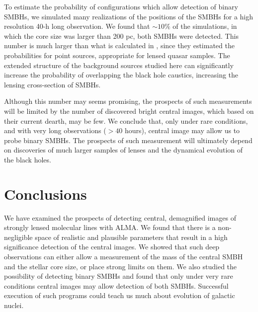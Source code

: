 \documentclass[chicago]{emulateapj}
\begin{document}
To estimate the probability of configurations which allow detection of binary SMBHs, we simulated many realizations of the positions of the SMBHs for a high resolution 40-h long observation. 
We found that $\sim10\%$ of the simulations, in which the core size was larger than 200 pc, both SMBHs were detected. 
This number is much larger than what is calculated in \citet{Li:12}, since they estimated  the probabilities for point sources, appropriate for lensed quasar samples. The extended structure of the background sources studied here can significantly increase the probability of overlapping the black hole caustics, increasing the lensing cross-section of SMBHs.

  Although this number may seems promising, the prospects of such measurements will be limited by the number of discovered bright central images, which based on their current dearth, may be few. We conclude that, only under rare conditions, and with very long observations ($>40$ hours), central image may allow us to probe binary SMBHs. The prospects of such measurement will ultimately depend on discoveries of much larger samples of lenses and the dynamical evolution of the black holes.






\section{Conclusions}
We have examined the prospects of detecting central, demagnified images of strongly lensed molecular lines with ALMA. We found that there is a non-negligible space of realistic and plausible parameters that result in a high significance detection of the central images. We showed that such deep observations can either allow a measurement of the mass of the central SMBH and the stellar core size, or place strong limits on them.
We also studied the possibility of detecting binary SMBHs and found that only under very rare conditions central images may allow detection of both SMBHs. Successful execution of such programs could teach us much about evolution of galactic nuclei.








\end{document}
